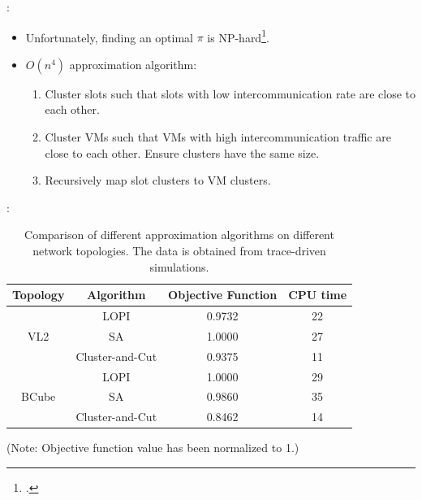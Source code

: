 \documentclass[aspectratio=169]{beamer}
\begin{document}
\begin{frame}{\insertsectionhead: \insertsubsectionhead}
    \begin{itemize}
        \item
            Unfortunately, finding an optimal \(\pi\) is NP-hard\footcite{meng_traffic_aware_2010}.

        \item
            \(O(n^4)\) approximation algorithm:

            \begin{enumerate}
                \item
                    Cluster slots such that slots with low intercommunication rate are close to each other.

                \item
                    Cluster VMs such that VMs with high intercommunication traffic are close to each other.
                    Ensure clusters have the same size.

                \item
                    Recursively map slot clusters to VM clusters.
            \end{enumerate}
    \end{itemize}
\end{frame}

\begin{frame}{\insertsectionhead: \insertsubsectionhead}
    \centering
    \begin{table}
        \begin{tabular}{cccc}
            \textbf{Topology} & \textbf{Algorithm} & \textbf{Objective Function} & \textbf{CPU time} \\ \toprule
                              & LOPI               & 0.9732                      & 22 \\
            VL2               & SA                 & 1.0000                      & 27 \\
                              & Cluster-and-Cut    & 0.9375                      & 11 \\ \midrule
                              & LOPI               & 1.0000                      & 29 \\
            BCube             & SA                 & 0.9860                      & 35 \\
                              & Cluster-and-Cut    & 0.8462                      & 14 \\ \bottomrule
        \end{tabular}

        {\footnotesize (Note: Objective function value has been normalized to 1.)}

        \vspace{0.5cm}
        \caption{
            Comparison of different approximation algorithms on different network topologies.
            The data is obtained from trace-driven simulations. \cite{meng_traffic_aware_2010}
        }
    \end{table}
\end{frame}
\end{document}
